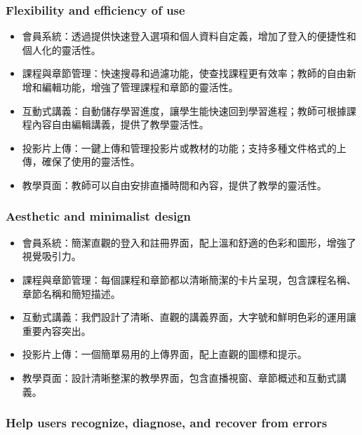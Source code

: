 \documentclass[12pt]{article}
\begin{document}
\subsubsection{Flexibility and efficiency of use}

\begin{itemize}
  \item 會員系統：透過提供快速登入選項和個人資料自定義，增加了登入的便捷性和個人化的靈活性。
  \item 課程與章節管理：快速搜尋和過濾功能，使查找課程更有效率；教師的自由新增和編輯功能，增強了管理課程和章節的靈活性。
  \item 互動式講義：自動儲存學習進度，讓學生能快速回到學習進程；教師可根據課程內容自由編輯講義，提供了教學靈活性。
  \item 投影片上傳：一鍵上傳和管理投影片或教材的功能；支持多種文件格式的上傳，確保了使用的靈活性。
  \item 教學頁面：教師可以自由安排直播時間和內容，提供了教學的靈活性。
\end{itemize}

\subsubsection{Aesthetic and minimalist design}

\begin{itemize}
  \item 會員系統：簡潔直觀的登入和註冊界面，配上溫和舒適的色彩和圖形，增強了視覺吸引力。
  \item 課程與章節管理：每個課程和章節都以清晰簡潔的卡片呈現，包含課程名稱、章節名稱和簡短描述。
  \item 互動式講義：我們設計了清晰、直觀的講義界面，大字號和鮮明色彩的運用讓重要內容突出。
  \item 投影片上傳：一個簡單易用的上傳界面，配上直觀的圖標和提示。
  \item 教學頁面：設計清晰整潔的教學界面，包含直播視窗、章節概述和互動式講義。
\end{itemize}


\subsubsection{Help users recognize, diagnose, and recover from errors}
\end{document}
